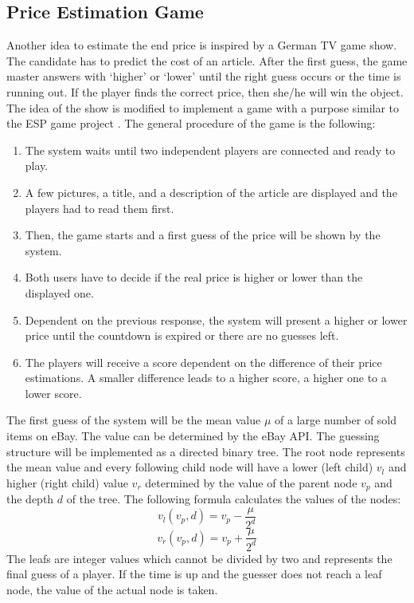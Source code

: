 \subsection{Price Estimation Game}
Another idea to estimate the end price is inspired by a German TV game show. The candidate has to predict the cost of an article. After the first guess, the game master answers with `higher' or `lower' until the right guess occurs or the time is running out. If the player finds the correct price, then she/he will win the object.
The idea of the show is modified to implement a game with a purpose similar to the ESP game project \cite{esp}. The general procedure of the game is the following: 
\begin{enumerate}
	\item The system waits until two independent players are connected and ready to play. 
	\item A few pictures, a title, and a description of the article are displayed and the players had to read them first. 
	\item Then, the game starts and a first guess of the price will be shown by the system. 
	\item Both users have to decide if the real price is higher or lower than the displayed one. 
	\item Dependent on the previous response, the system will present a higher or lower price until the countdown is expired or there are no guesses left. 
	\item The players will receive a score dependent on the difference of their price estimations. A smaller difference leads to a higher score, a higher one to a lower score. 
\end{enumerate}
The first guess of the system will be the mean value \( \mu \) of a large number of sold items on eBay. The value can be determined by the eBay API. The guessing structure will be implemented as a directed binary tree. The root node represents the mean value and every following child node will have a lower (left child) \( v_l \) and higher (right child) value \( v_r \) determined by the value of the parent node \( v_p \) and the depth \( d \) of the tree. The following formula calculates the values of the nodes: 
\begin{equation}
v_l(v_p,d) = v_p - \frac{\mu}{2^d}
\end{equation}
\begin{equation}
v_r(v_p,d) = v_p + \frac{\mu}{2^d}
\end{equation}
The leafs are integer values which cannot be divided by two and represents the final guess of a player. If the time is up and the guesser does not reach a leaf node, the value of the actual node is taken. 
